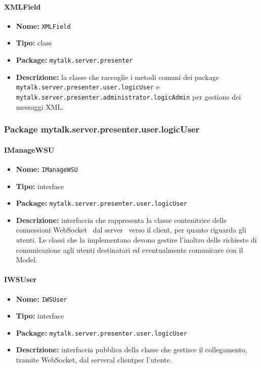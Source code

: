 \paragraph{XMLField}{
	\begin{itemize}
		\item [] \textbf{Nome:} \texttt{XMLField}
		\item [] \textbf{Tipo:} class
		\item [] \textbf{Package:} \texttt{mytalk.server.presenter}
		\item [] \textbf{Descrizione:}{ la classe che raccoglie i metodi comuni dei package\g~ \\ \texttt{mytalk.server.presenter.user.logicUser} e \\ \texttt{mytalk.server.presenter.administrator.logicAdmin} per gestione dei messaggi XML\g.
		}
	\end{itemize}
}

\newpage

\subsubsection{Package mytalk.server.presenter.user.logicUser}
\paragraph{IManageWSU}{
	\begin{itemize}
		\item [] \textbf{Nome:} \texttt{IManageWSU}
		\item [] \textbf{Tipo:} interface
		\item [] \textbf{Package:} \texttt{mytalk.server.presenter.user.logicUser}
		\item [] \textbf{Descrizione:}{ interfaccia che rappresenta la classe contenitrice delle connessioni WebSocket\g~ dal server\g~ verso il client\g, per quanto riguarda gli utenti. Le classi che la implementano devono gestire l'inoltro delle richieste di comunicazione agli utenti destinatari ed eventualmente comunicare con il Model.}
	\end{itemize}
}
\paragraph{IWSUser}{
	\begin{itemize}
		\item [] \textbf{Nome:} \texttt{IWSUser}
		\item [] \textbf{Tipo:} interface
		\item [] \textbf{Package:} \texttt{mytalk.server.presenter.user.logicUser}
		\item [] \textbf{Descrizione:}{ interfaccia pubblica della classe che gestisce il collegamento, tramite WebSocket\g, dal server\g al client\g per l'utente.}
	\end{itemize}
}

